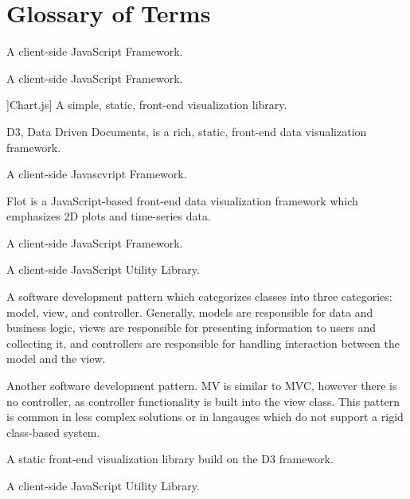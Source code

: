 \documentclass{report}
\begin{document}


\dotableofcontents

\newpage

\chapter*{Glossary of Terms}
\begin{description}
\item[Angular.js] A client-side JavaScript Framework.
\item[Backbone.js] A client-side JavaScript Framework.
\item]Chart.js] A simple, static, front-end visualization library.
\item[D3.js] D3, Data Driven Documents, is a rich, static, front-end data visualization framework.
\item[DOJO] A client-side Javascvript Framework.
\item[Flot] Flot is a JavaScript-based front-end data visualization framework which emphasizes 2D plots and time-series data.
\item[JavaScript MVC] A client-side JavaScript Framework.
\item[jQuery] A client-side JavaScript Utility Library.
\item[MVC] A software development pattern which categorizes classes into three categories: model, view, and controller. Generally, models are responsible for data and business logic, views are responsible for presenting information to users and collecting it, and controllers are responsible for handling interaction between the model and the view.
\item[MV] Another software development pattern. MV is similar to MVC, however there is no controller, as controller functionality is built into the view class. This pattern is common in less complex solutions or in langauges which do not support a rigid class-based system.
\item[Rickshaw] A static front-end visualization library build on the D3 framework.
\item[Underscore.js] A client-side JavaScript Utility Library.
\end{description}
\end{document}
